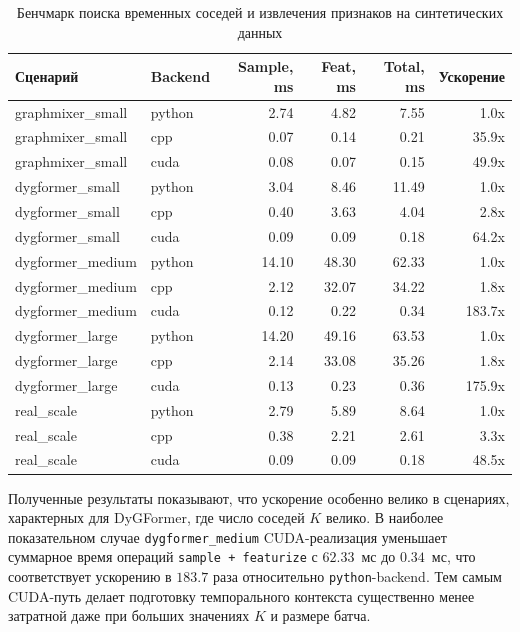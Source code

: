 \documentclass[a4paper,12pt]{extarticle}
\begin{document}
  \begin{table}[h]
  \centering
  \caption{Бенчмарк поиска временных соседей и извлечения признаков на синтетических данных}
  \label{tab:cuda_sampling_bench}
  \begin{tabular}{l l r r r r}
  \toprule
  Сценарий & Backend & Sample, ms & Feat, ms & Total, ms & Ускорение \\
  \midrule
  graphmixer\_small & python & 2.74 & 4.82 & 7.55 & 1.0x \\
  graphmixer\_small & cpp    & 0.07 & 0.14 & 0.21 & 35.9x \\
  graphmixer\_small & cuda   & 0.08 & 0.07 & 0.15 & 49.9x \\
  \midrule
  dygformer\_small  & python & 3.04 & 8.46 & 11.49 & 1.0x \\
  dygformer\_small  & cpp    & 0.40 & 3.63 & 4.04 & 2.8x \\
  dygformer\_small  & cuda   & 0.09 & 0.09 & 0.18 & 64.2x \\
  \midrule
  dygformer\_medium & python & 14.10 & 48.30 & 62.33 & 1.0x \\
  dygformer\_medium & cpp    & 2.12 & 32.07 & 34.22 & 1.8x \\
  dygformer\_medium & cuda   & 0.12 & 0.22 & 0.34 & 183.7x \\
  \midrule
  dygformer\_large  & python & 14.20 & 49.16 & 63.53 & 1.0x \\
  dygformer\_large  & cpp    & 2.14 & 33.08 & 35.26 & 1.8x \\
  dygformer\_large  & cuda   & 0.13 & 0.23 & 0.36 & 175.9x \\
  \midrule
  real\_scale       & python & 2.79 & 5.89 & 8.64 & 1.0x \\
  real\_scale       & cpp    & 0.38 & 2.21 & 2.61 & 3.3x \\
  real\_scale       & cuda   & 0.09 & 0.09 & 0.18 & 48.5x \\
  \bottomrule
  \end{tabular}
  \end{table}

  Полученные результаты показывают, что ускорение особенно велико в сценариях, характерных для DyGFormer, где число соседей $K$ велико. В наиболее показательном
  случае \texttt{dygformer\_medium} CUDA-реализация уменьшает суммарное время операций \texttt{sample + featurize} с $62.33$~мс до $0.34$~мс, что соответствует
  ускорению в $183.7$ раза относительно \texttt{python}-backend. Тем самым CUDA-путь делает подготовку темпорального контекста существенно менее затратной даже при
  больших значениях $K$ и размере батча.
\end{document}
